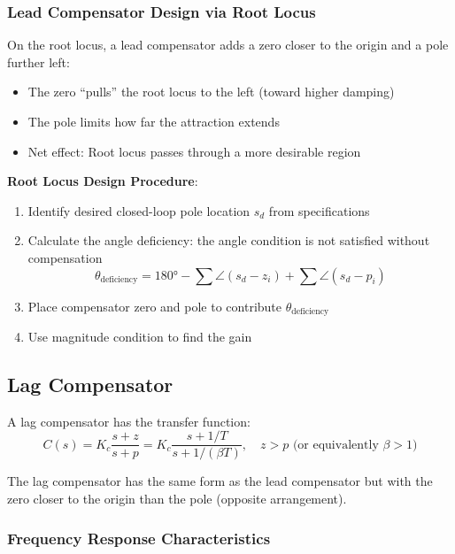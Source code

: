 \subsubsection{Lead Compensator Design via Root Locus}

On the root locus, a lead compensator adds a zero closer to the origin and a pole further left:
\begin{itemize}
    \item The zero ``pulls'' the root locus to the left (toward higher damping)
    \item The pole limits how far the attraction extends
    \item Net effect: Root locus passes through a more desirable region
\end{itemize}

\textbf{Root Locus Design Procedure}:
\begin{enumerate}
    \item Identify desired closed-loop pole location $s_d$ from specifications
    \item Calculate the angle deficiency: the angle condition is not satisfied without compensation
    \begin{equation}
    \theta_{\text{deficiency}} = 180° - \sum \angle(s_d - z_i) + \sum \angle(s_d - p_i)
    \end{equation}
    \item Place compensator zero and pole to contribute $\theta_{\text{deficiency}}$
    \item Use magnitude condition to find the gain
\end{enumerate}

\subsection{Lag Compensator}
\label{subsec:lag_compensator}

A lag compensator has the transfer function:
\begin{equation}
\boxed{C(s) = K_c \frac{s + z}{s + p} = K_c \frac{s + 1/T}{s + 1/(\beta T)}, \quad z > p \text{ (or equivalently } \beta > 1\text{)}}
\label{eq:lag_compensator}
\end{equation}

The lag compensator has the same form as the lead compensator but with the zero closer to the origin than the pole (opposite arrangement).

\subsubsection{Frequency Response Characteristics}

